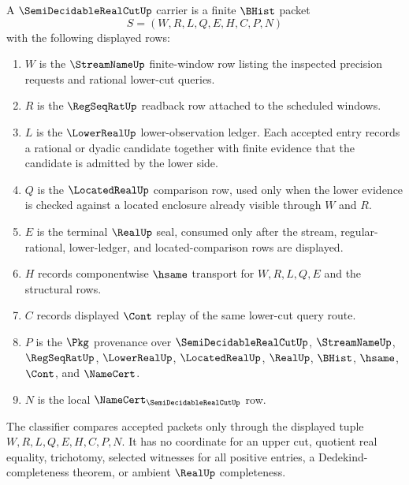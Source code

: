 \begin{definition}
\label{def:semi-decidable-real-cut-carrier}
A $\SemiDecidableRealCutUp$ carrier is a finite $\BHist$ packet
$$
S=(W,R,L,Q,E,H,C,P,N)
$$
with the following displayed rows:
\begin{enumerate}
\item $W$ is the $\StreamNameUp$ finite-window row listing the inspected precision requests and rational lower-cut queries.
\item $R$ is the $\RegSeqRatUp$ readback row attached to the scheduled windows.
\item $L$ is the $\LowerRealUp$ lower-observation ledger. Each accepted entry records a rational or dyadic candidate together with finite evidence that the candidate is admitted by the lower side.
\item $Q$ is the $\LocatedRealUp$ comparison row, used only when the lower evidence is checked against a located enclosure already visible through $W$ and $R$.
\item $E$ is the terminal $\RealUp$ seal, consumed only after the stream, regular-rational, lower-ledger, and located-comparison rows are displayed.
\item $H$ records componentwise $\hsame$ transport for $W,R,L,Q,E$ and the structural rows.
\item $C$ records displayed $\Cont$ replay of the same lower-cut query route.
\item $P$ is the $\Pkg$ provenance over $\SemiDecidableRealCutUp$, $\StreamNameUp$, $\RegSeqRatUp$, $\LowerRealUp$, $\LocatedRealUp$, $\RealUp$, $\BHist$, $\hsame$, $\Cont$, and $\NameCert$.
\item $N$ is the local $\NameCert_{\SemiDecidableRealCutUp}$ row.
\end{enumerate}
The classifier compares accepted packets only through the displayed tuple $W,R,L,Q,E,H,C,P,N$. It has no coordinate for an upper cut, quotient real equality, trichotomy, selected witnesses for all positive entries, a Dedekind-completeness theorem, or ambient $\RealUp$ completeness.
\end{definition}


